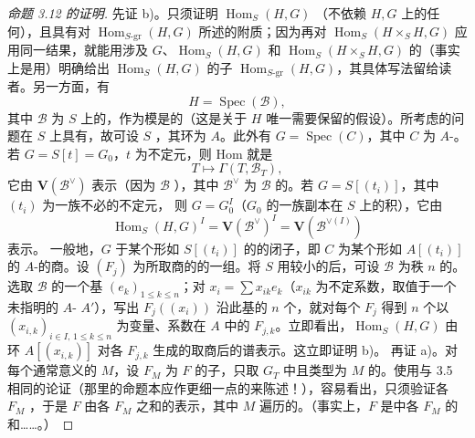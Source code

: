 \begin{proof}[命题 3.12 的证明]
先证 b)。只须证明 $\operatorname{Hom}_S(H,G)$ （不依赖 $H,G$ 上的任何），且具有对 $\operatorname{Hom}_{S\text{-gr}}(H,G)$ 所述的附质；因为再对 $\operatorname{Hom}_S(H\times_S H,G)$ 应用同一结果，就能用涉及 $G$、$\operatorname{Hom}_S(H,G)$ 和 $\operatorname{Hom}_S(H\times_S H,G)$ 的（事实上是用）明确给出 $\operatorname{Hom}_S(H,G)$ 的子 $\operatorname{Hom}_{S\text{-gr}}(H,G)$，其具体写法留给读者。另一方面，有
\[H=\operatorname{Spec}(\mathscr B),\]
其中 $\mathscr B$ 为 $S$ 上的，作为模是的（这是关于 $H$ 唯一需要保留的假设）。所考虑的问题在 $S$ 上具有，故可设 $S$ ，其环为 $A$。此外有 $G=\operatorname{Spec}(C)$，其中 $C$ 为 $A$-。若 $G=S[t]=G_0$，$t$ 为不定元，则 Hom 就是
\[T\longmapsto\Gamma(T,\mathscr B_T),\]
它由 $\mathbf V(\mathscr B^\vee)$ 表示（因为 $\mathscr B$ ），其中 $\mathscr B^\vee$ 为 $\mathscr B$ 的。若 $G=S[(t_i)]$，其中 $(t_i)$ 为一族不必的不定元，
则 $G=G_0^I$（$G_0$ 的一族副本在 $S$ 上的积），它由
\[\operatorname{Hom}_S(H,G)^I=\mathbf V(\mathscr B^\vee)^I=\mathbf V(\mathscr B^{\vee(I)})\]
表示。
一般地，$G$ 于某个形如 $S[(t_i)]$ 的的闭子，即 $C$ 为某个形如 $A[(t_i)]$ 的 $A$-的商。设 $(F_j)$ 为所取商的的一组。将 $S$ 用较小的后，可设 $\mathscr B$ 为秩 $n$ 的。选取 $\mathscr B$ 的一个基 $(e_k)_{1\le k\le n}$；对 $x_i=\sum x_{ik}e_k$（$x_{ik}$ 为不定系数，取值于一个未指明的 $A$- $A'$），写出 $F_j((x_i))$ 沿此基的 $n$ 个，就对每个 $F_j$ 得到 $n$ 个以 $(x_{i,k})_{i\in I,\,1\le k\le n}$ 为变量、系数在 $A$ 中的 $F_{j,k}$。立即看出，$\operatorname{Hom}_S(H,G)$ 由环 $A[(x_{i,k})]$ 对各 $F_{j,k}$ 生成的取商后的谱表示。这立即证明 b)。
再证 a)。对每个通常意义的 $M$，设 $F_M$ 为 $F$ 的子，只取 $G_T$ 中且类型为 $M$ 的。使用与 3.5 相同的论证（那里的命题本应作更细一点的来陈述！），容易看出，只须验证各 $F_M$ ，于是 $F$ 由各 $F_M$ 之和的表示，其中 $M$ 遍历的。（事实上，$F$ 是中各 $F_M$ 的和……。）

\end{proof}
